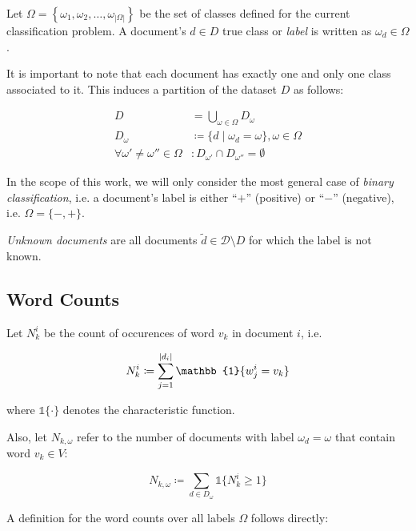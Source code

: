 Let $\Omega=\left\{\omega_1, \omega_2,\ldots,\omega_{|\Omega|}\right\}$ be the
set of classes defined for the current classification problem. A document's $d \in D$ true class or \emph{label} is written as
$\omega_{d} \in \Omega$.
  
It is important to note that each document has exactly one and
only one class associated to it. This induces a partition of the dataset $D$ as follows:

\begin{equation*}
\begin{split}
 D &= \bigcup\limits_{\omega \in \Omega} D_\omega \\
 D_\omega &\coloneqq  \{ d \mid \omega_d = \omega\}, \omega \in \Omega \\
\forall \omega' \neq \omega'' \in \Omega &: D_{\omega'} \cap D_{\omega''} =
 \emptyset
 \end{split} 
\end{equation*}

In the scope of this work, we will only consider the most general case of
\emph{binary classification}, i.e. a document's label is either ``$+$'' (positive) or
``$-$'' (negative), i.e.  $\Omega = \{-,+\}$. 
 
 \emph{Unknown documents} are all documents $\tilde{d} \in \mathcal{D}\setminus
 D$ for which the label is not known.
 
 \subsection{Word Counts}
 
Let $N_k^i$ be the count of occurences of word $v_k$ in document $i$, i.e.

\begin{equation*}
 N_k^i \coloneqq \sum\limits_{j=1}^{|d_i|} \mathbb{1}\{w_j^i = v_k\} \\ 
\end{equation*}

where $\mathbb{1}\{\cdot\}$ denotes the characteristic function.

Also, let $N_{k,\omega}$ refer to the number of documents with label $\omega_d = \omega$ 
that contain word $v_k \in V$:

\begin{equation*}
  N_{k,\omega} \coloneqq \sum\limits_{d \in D_\omega} \mathbb{1}\{N^i_k \geq 1\}
\end{equation*}

A definition for the word counts over all labels $\Omega$ follows
directly:

